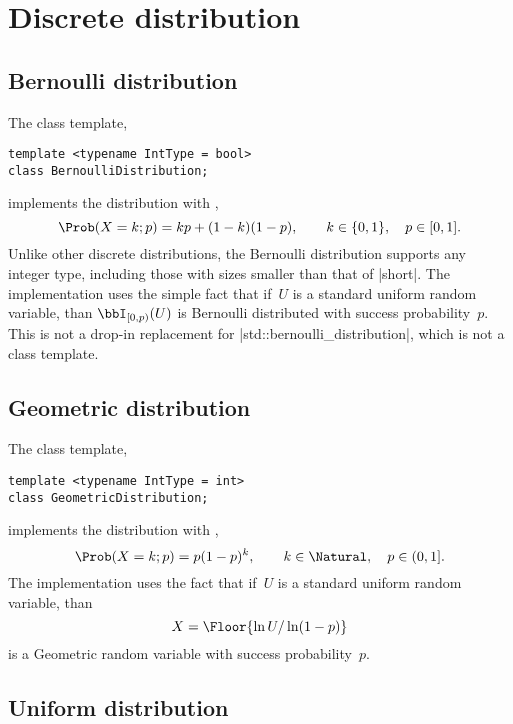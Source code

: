 \section{Discrete distribution}
\label{sec:Discrete distribution}

\subsection{Bernoulli distribution}
\label{sub:Bernoulli distribution}

The class template,
\begin{verbatim}
template <typename IntType = bool>
class BernoulliDistribution;
\end{verbatim}
implements the distribution with \pdf,
\begin{equation*}
  \Prob(X = k;p) = kp + (1 - k)(1 - p),\qquad
  k \in \{0, 1\},\quad p \in [0, 1].
\end{equation*}
Unlike other discrete distributions, the Bernoulli distribution supports any
integer type, including those with sizes smaller than that of |short|. The
implementation uses the simple fact that if~$U$ is a standard uniform random
variable, than $\bbI_{[0,p)}(U)$ is Bernoulli distributed with success
probability~$p$. This is not a drop-in replacement for
|std::bernoulli_distribution|, which is not a class template.

\subsection{Geometric distribution}
\label{sub:Geometric distribution}

The class template,
\begin{verbatim}
template <typename IntType = int>
class GeometricDistribution;
\end{verbatim}
implements the distribution with \pdf,
\begin{equation*}
  \Prob(X = k;p) = p(1-p)^k,\qquad
  k \in \Natural,\quad p \in (0, 1].
\end{equation*}
The implementation uses the fact that if~$U$ is a standard uniform random
variable, than
\begin{equation*}
  X = \Floor{\ln U / \ln(1-p)}
\end{equation*}
is a Geometric random variable with success probability~$p$.

\subsection{Uniform distribution}
\label{sub:Uniform distribution}

